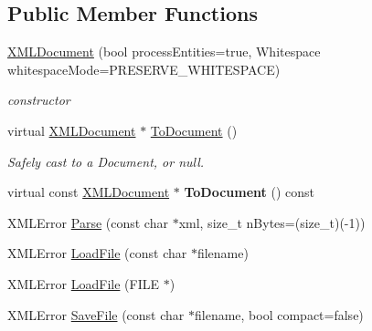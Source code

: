 \subsection*{Public Member Functions}
\begin{DoxyCompactItemize}
\item 
\mbox{\label{classtinyxml2_1_1XMLDocument_a57ddf17b6e054dda10af98991b1b8f70}} 
\mbox{\hyperlink{classtinyxml2_1_1XMLDocument_a57ddf17b6e054dda10af98991b1b8f70}{X\+M\+L\+Document}} (bool process\+Entities=true, Whitespace whitespace\+Mode=P\+R\+E\+S\+E\+R\+V\+E\+\_\+\+W\+H\+I\+T\+E\+S\+P\+A\+CE)
\begin{DoxyCompactList}\small\item\em constructor \end{DoxyCompactList}\item 
\mbox{\label{classtinyxml2_1_1XMLDocument_a3e185f880882bd978367bb55937735ec}} 
virtual \mbox{\hyperlink{classtinyxml2_1_1XMLDocument}{X\+M\+L\+Document}} $\ast$ \mbox{\hyperlink{classtinyxml2_1_1XMLDocument_a3e185f880882bd978367bb55937735ec}{To\+Document}} ()
\begin{DoxyCompactList}\small\item\em Safely cast to a Document, or null. \end{DoxyCompactList}\item 
\mbox{\label{classtinyxml2_1_1XMLDocument_a747ab173887d969fe313b4617f968e99}} 
virtual const \mbox{\hyperlink{classtinyxml2_1_1XMLDocument}{X\+M\+L\+Document}} $\ast$ {\bfseries To\+Document} () const
\item 
X\+M\+L\+Error \mbox{\hyperlink{classtinyxml2_1_1XMLDocument_a1819bd34f540a7304c105a6232d25a1f}{Parse}} (const char $\ast$xml, size\+\_\+t n\+Bytes=(size\+\_\+t)(-\/1))
\item 
X\+M\+L\+Error \mbox{\hyperlink{classtinyxml2_1_1XMLDocument_a2ebd4647a8af5fc6831b294ac26a150a}{Load\+File}} (const char $\ast$filename)
\item 
X\+M\+L\+Error \mbox{\hyperlink{classtinyxml2_1_1XMLDocument_a5f1d330fad44c52f3d265338dd2a6dc2}{Load\+File}} (F\+I\+LE $\ast$)
\item 
X\+M\+L\+Error \mbox{\hyperlink{classtinyxml2_1_1XMLDocument_a73ac416b4a2aa0952e841220eb3da18f}{Save\+File}} (const char $\ast$filename, bool compact=false)
\item 

\end{DoxyCompactItemize}
